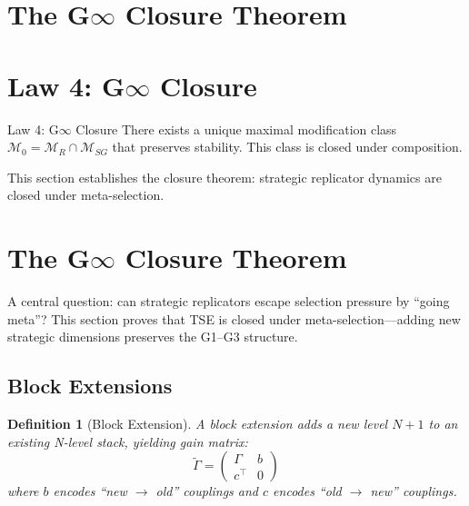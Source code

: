 \documentclass[12pt]{article}
\newtheorem{definition}[theorem]{Definition}
\begin{document}

\section{The G$\infty$ Closure Theorem}


\section{Law 4: G$\infty$ Closure}
\label{sec:law4}

\begin{lawbox}{Law 4: G$\infty$ Closure}
There exists a unique maximal modification class $\mathcal{M}_0 = \mathcal{M}_R \cap \mathcal{M}_{SG}$ that preserves stability. This class is closed under composition.
\end{lawbox}

This section establishes the closure theorem: strategic replicator dynamics are closed under meta-selection.

\section{The G$\infty$ Closure Theorem}
\label{sec:g-infinity}

A central question: can strategic replicators escape selection pressure by ``going meta''? This section proves that TSE is closed under meta-selection---adding new strategic dimensions preserves the G1--G3 structure.

\subsection{Block Extensions}

\begin{definition}[Block Extension]
A \emph{block extension} adds a new level $N+1$ to an existing N-level stack, yielding gain matrix:
\[
\tilde{\Gamma} = \begin{pmatrix} \Gamma & b \\ c^\top & 0 \end{pmatrix}
\]
where $b$ encodes ``new $\to$ old'' couplings and $c$ encodes ``old $\to$ new'' couplings.
\end{definition}
\end{document}
